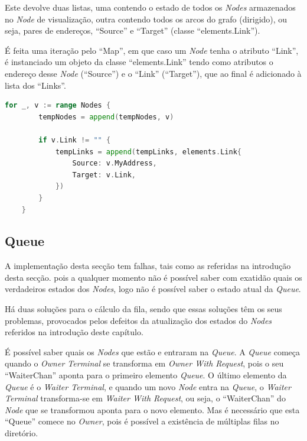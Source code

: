 Este devolve duas listas, uma contendo o estado de todos os \emph{Nodes} armazenados no \emph{Node} de visualização, 
outra contendo todos os arcos do grafo (dirigido), ou seja, pares de endereços, ``Source'' e ``Target'' (classe ``elements.Link''). 

É feita uma iteração pelo ``Map'', em que caso um \emph{Node} tenha o atributo ``Link'', é instanciado um objeto da classe
``elements.Link'' tendo como atributos o endereço desse \emph{Node} (``Source'') e o ``Link'' (``Target''), que ao final é 
adicionado à lista dos ``Links''.


\begin{lstlisting}[caption={Iteração pelo ``Map'' ``Nodes'', instanciação do objeto e adicionado à lista },language=Go]
	for _, v := range Nodes {
		tempNodes = append(tempNodes, v)

		if v.Link != "" {
			tempLinks = append(tempLinks, elements.Link{
				Source: v.MyAddress,
				Target: v.Link,
			})
		}
	}
\end{lstlisting}






\subsection{Queue}
A implementação desta secção tem falhas, tais como as referidas na introdução desta secção.
pois a qualquer momento não é possível saber com exatidão quais os verdadeiros estados dos \emph{Nodes},
logo não é possível saber o estado atual da \emph{Queue}.

Há duas soluções para o cálculo da fila, sendo que essas soluções têm os seus problemas, provocados pelos defeitos da atualização dos estados do \emph{Nodes} referidos na introdução deste capítulo.


É possível saber quais os \emph{Nodes} que estão e entraram na \emph{Queue}. A \emph{Queue} começa quando o \emph{Owner Terminal} se transforma em \emph{Owner With Request}, pois o seu ``WaiterChan'' aponta para o primeiro
elemento \emph{Queue}. O último elemento da \emph{Queue} é o \emph{Waiter Terminal}, e quando um novo \emph{Node} entra na \emph{Queue}, o \emph{Waiter Terminal} transforma-se em \emph{Waiter With Request}, ou seja, o ``WaiterChan'' do \emph{Node} que se transformou aponta para o novo elemento. Mas é necessário que esta ``Queue'' comece no \emph{Owner}, pois é possível a existência de múltiplas filas no diretório.

